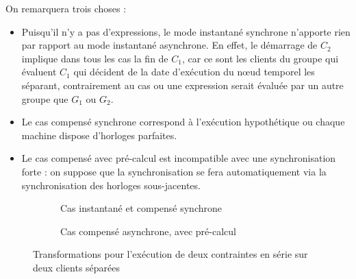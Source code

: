\documentclass[10pt]{article}
\begin{document}
On remarquera trois choses : 
\begin{itemize}
    \item Puisqu'il n'y a pas d'expressions, le mode instantané synchrone n'apporte rien par rapport au mode instantané asynchrone.
    En effet, le démarrage de $C_2$ implique dans tous les cas la fin de $C_1$, car ce sont les clients du groupe qui évaluent $C_1$ qui décident de la date d'exécution du nœud temporel les séparant, contrairement au cas ou une expression serait évaluée par un autre groupe que $G_1$ ou $G_2$.
    \item Le cas compensé synchrone correspond à l'exécution hypothétique ou chaque machine dispose d'horloges parfaites.
    \item Le cas compensé avec pré-calcul est incompatible avec une synchronisation forte : on suppose que la synchronisation se fera automatiquement via la synchronisation des horloges sous-jacentes.
\end{itemize}

\begin{figure}[h]
\centering
\begin{subfigure}{.5\linewidth}
\begin{tikzpicture}

\end{tikzpicture}
\caption{Cas instantané et compensé synchrone}
\label{depl.simple.async.instant}
\end{subfigure}

\begin{subfigure}{.5\linewidth}
    \begin{tikzpicture}
    
    \end{tikzpicture}
    \caption{Cas compensé asynchrone, avec pré-calcul}
    \label{depl.simple.sync.comp}
\end{subfigure}
\caption{Transformations pour l'exécution de deux contraintes en série sur deux clients séparées}
\label{scenar.deplacement}
\end{figure}




\end{document}
